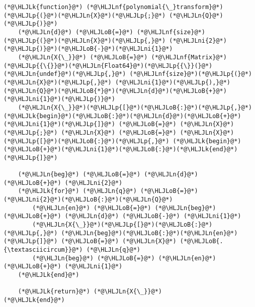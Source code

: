\documentclass[12pt,a4paper]{article}
\newcommand{\HLJLk}[1]{\textcolor[RGB]{148,91,176}{\textbf{#1}}}
\newcommand{\HLJLn}[1]{#1}
\newcommand{\HLJLnf}[1]{\textcolor[RGB]{66,102,213}{#1}}
\newcommand{\HLJLni}[1]{\textcolor[RGB]{59,151,46}{#1}}
\newcommand{\HLJLoB}[1]{\textcolor[RGB]{102,102,102}{\textbf{#1}}}
\newcommand{\HLJLp}[1]{#1}
\begin{document}
\begin{lstlisting}
(*@\HLJLk{function}@*) (*@\HLJLnf{polynomial{\_}transform}@*)(*@\HLJLp{(}@*)(*@\HLJLn{X}@*)(*@\HLJLp{;}@*) (*@\HLJLn{Q}@*)(*@\HLJLp{)}@*)
    (*@\HLJLn{d}@*) (*@\HLJLoB{=}@*) (*@\HLJLnf{size}@*)(*@\HLJLp{(}@*)(*@\HLJLn{X}@*)(*@\HLJLp{,}@*) (*@\HLJLni{2}@*)(*@\HLJLp{)}@*)(*@\HLJLoB{-}@*)(*@\HLJLni{1}@*)
    (*@\HLJLn{X{\_}}@*) (*@\HLJLoB{=}@*) (*@\HLJLnf{Matrix}@*)(*@\HLJLp{{\{}}@*)(*@\HLJLn{Float64}@*)(*@\HLJLp{{\}}(}@*)(*@\HLJLn{undef}@*)(*@\HLJLp{,}@*) (*@\HLJLnf{size}@*)(*@\HLJLp{(}@*)(*@\HLJLn{X}@*)(*@\HLJLp{,}@*) (*@\HLJLni{1}@*)(*@\HLJLp{),}@*) (*@\HLJLn{Q}@*)(*@\HLJLoB{*}@*)(*@\HLJLn{d}@*)(*@\HLJLoB{+}@*)(*@\HLJLni{1}@*)(*@\HLJLp{)}@*)
    (*@\HLJLn{X{\_}}@*)(*@\HLJLp{[}@*)(*@\HLJLoB{:}@*)(*@\HLJLp{,}@*) (*@\HLJLk{begin}@*)(*@\HLJLoB{:}@*)(*@\HLJLn{d}@*)(*@\HLJLoB{+}@*)(*@\HLJLni{1}@*)(*@\HLJLp{]}@*) (*@\HLJLoB{=}@*) (*@\HLJLn{X}@*)(*@\HLJLp{;}@*) (*@\HLJLn{X}@*) (*@\HLJLoB{=}@*) (*@\HLJLn{X}@*)(*@\HLJLp{[}@*)(*@\HLJLoB{:}@*)(*@\HLJLp{,}@*) (*@\HLJLk{begin}@*)(*@\HLJLoB{+}@*)(*@\HLJLni{1}@*)(*@\HLJLoB{:}@*)(*@\HLJLk{end}@*)(*@\HLJLp{]}@*)

    (*@\HLJLn{beg}@*) (*@\HLJLoB{=}@*) (*@\HLJLn{d}@*) (*@\HLJLoB{+}@*) (*@\HLJLni{2}@*)
    (*@\HLJLk{for}@*) (*@\HLJLn{q}@*) (*@\HLJLoB{=}@*) (*@\HLJLni{2}@*)(*@\HLJLoB{:}@*)(*@\HLJLn{Q}@*)
        (*@\HLJLn{en}@*) (*@\HLJLoB{=}@*) (*@\HLJLn{beg}@*) (*@\HLJLoB{+}@*) (*@\HLJLn{d}@*) (*@\HLJLoB{-}@*) (*@\HLJLni{1}@*)
        (*@\HLJLn{X{\_}}@*)(*@\HLJLp{[}@*)(*@\HLJLoB{:}@*)(*@\HLJLp{,}@*) (*@\HLJLn{beg}@*)(*@\HLJLoB{:}@*)(*@\HLJLn{en}@*)(*@\HLJLp{]}@*) (*@\HLJLoB{=}@*) (*@\HLJLn{X}@*) (*@\HLJLoB{.{\textasciicircum}}@*) (*@\HLJLn{q}@*)
        (*@\HLJLn{beg}@*) (*@\HLJLoB{=}@*) (*@\HLJLn{en}@*) (*@\HLJLoB{+}@*) (*@\HLJLni{1}@*)
    (*@\HLJLk{end}@*)

    (*@\HLJLk{return}@*) (*@\HLJLn{X{\_}}@*)
(*@\HLJLk{end}@*)
\end{lstlisting}
\end{document}
